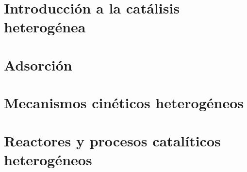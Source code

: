 \documentclass[10pt, letterpaper]{article}
\begin{document}
    \tableofcontents
    \clearpage


    \section{Introducción a la catálisis heterogénea}

    \section{Adsorción}

    \section{Mecanismos cinéticos heterogéneos}

    \section{Reactores y procesos catalíticos heterogéneos}

    \printbibliography[title=Bibliografía] 
    
\end{document}
